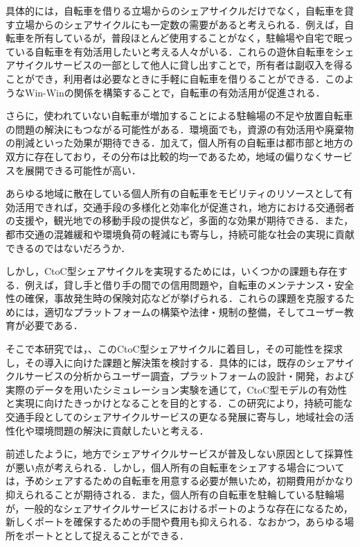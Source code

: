        \par 具体的には，自転車を借りる立場からのシェアサイクルだけでなく，自転車を貸す立場からのシェアサイクルにも一定数の需要があると考えられる．例えば，自転車を所有しているが，普段ほとんど使用することがなく，駐輪場や自宅で眠っている自転車を有効活用したいと考える人々がいる．これらの遊休自転車をシェアサイクルサービスの一部として他人に貸し出すことで，所有者は副収入を得ることができ，利用者は必要なときに手軽に自転車を借りることができる．このようなWin-Winの関係を構築することで，自転車の有効活用が促進される．
       \par さらに，使われていない自転車が増加することによる駐輪場の不足や放置自転車の問題の解決にもつながる可能性がある．環境面でも，資源の有効活用や廃棄物の削減といった効果が期待できる．加えて，個人所有の自転車は都市部と地方の双方に存在しており，その分布は比較的均一であるため，地域の偏りなくサービスを展開できる可能性が高い．
        \par あらゆる地域に散在している個人所有の自転車をモビリティのリソースとして有効活用できれば，交通手段の多様化と効率化が促進され，地方における交通弱者の支援や，観光地での移動手段の提供など，多面的な効果が期待できる．また，都市交通の混雑緩和や環境負荷の軽減にも寄与し，持続可能な社会の実現に貢献できるのではないだろうか．
        \par しかし，CtoC型シェアサイクルを実現するためには，いくつかの課題も存在する．例えば，貸し手と借り手の間での信用問題や，自転車のメンテナンス・安全性の確保，事故発生時の保険対応などが挙げられる．これらの課題を克服するためには，適切なプラットフォームの構築や法律・規制の整備，そしてユーザー教育が必要である．
        \par そこで本研究では，、このCtoC型シェアサイクルに着目し，その可能性を探求し，その導入に向けた課題と解決策を検討する．具体的には，既存のシェアサイクルサービスの分析からユーザー調査，プラットフォームの設計・開発，および実際のデータを用いたシミュレーション実験を通じて，CtoC型モデルの有効性と実現に向けたきっかけとなることを目的とする．この研究により，持続可能な交通手段としてのシェアサイクルサービスの更なる発展に寄与し，地域社会の活性化や環境問題の解決に貢献したいと考える．
        \par 前述したように，地方でシェアサイクルサービスが普及しない原因として採算性が悪い点が考えられる．しかし，個人所有の自転車をシェアする場合については，予めシェアするための自転車を用意する必要が無いため，初期費用がかなり抑えられることが期待される．また，個人所有の自転車を駐輪している駐輪場が，一般的なシェアサイクルサービスにおけるポートのような存在になるため，新しくポートを確保するための手間や費用も抑えられる．なおかつ，あらゆる場所をポートととして捉えることができる．

